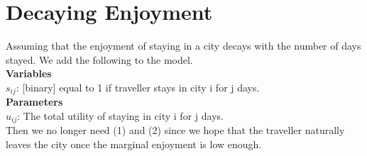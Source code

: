\documentclass[a4paper]{article}
\begin{document}
\newpage
\section{Decaying Enjoyment}
Assuming that the enjoyment of staying in a city decays with the number of days stayed. We add the following to the model.\\

\textbf{Variables}\\
$s_{ij}$: [binary] equal to 1 if traveller stays in city i for j days.\\

\textbf{Parameters} \\
$u_{ij}$: The total utility of staying in city i for j days.\\

Then we no longer need (1) and (2) since we hope that the traveller naturally leaves the city once the marginal enjoyment is low enough.\\
\end{document}
